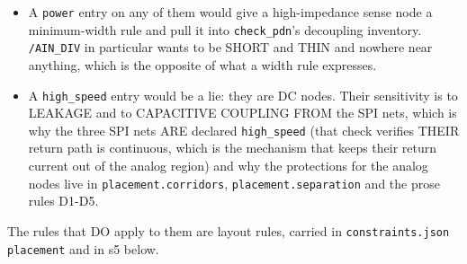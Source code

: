 \documentclass[11pt,a4paper]{article}
\begin{document}
\begin{itemize}
\item A \texttt{power} entry on any of them would give a high-impedance sense node a
minimum-width rule and pull it into \texttt{check\_pdn}'s decoupling inventory.
\texttt{/AIN\_DIV} in particular wants to be SHORT and THIN and nowhere near
anything, which is the opposite of what a width rule expresses.
\item A \texttt{high\_speed} entry would be a lie: they are DC nodes. Their sensitivity is
to LEAKAGE and to CAPACITIVE COUPLING FROM the SPI nets, which is why the
three SPI nets ARE declared \texttt{high\_speed} (that check verifies THEIR return
path is continuous, which is the mechanism that keeps their return current
out of the analog region) and why the protections for the analog nodes live
in \texttt{placement.corridors}, \texttt{placement.separation} and the prose rules D1-D5.
\end{itemize}
The rules that DO apply to them are layout rules, carried in \texttt{constraints.json} \texttt{placement} and in s5 below.
\end{document}
